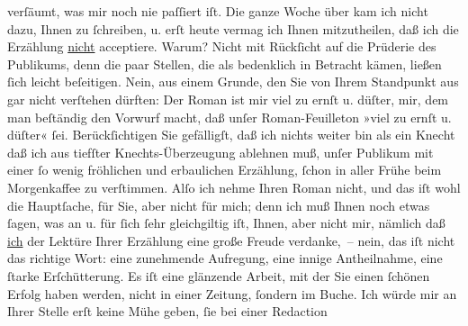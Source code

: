\begin{ledgroupsized}[t]{13cm}
               verſäumt, was mir noch nie paſſiert iſt. Die ganze Woche über kam ich nicht dazu,
               Ihnen zu ſchreiben, u. erſt heute vermag ich Ihnen mitzutheilen, daß ich die
               Erzählung \uline{nicht} acceptiere.\pend
           \pstart
           Warum? Nicht mit Rückſicht auf die Prüderie des Publikums, denn die paar Stellen, die
               als bedenklich in Betracht kämen, ließen ſich leicht beſeitigen. Nein, aus einem
               Grunde, den Sie von Ihrem Standpunkt aus gar nicht verſtehen dürften: Der Roman ist mir viel zu ernſt u.
               düſter, mir, dem man beſtändig den Vorwurf macht, daß unſer Roman-Feuilleton »viel zu
               ernſt u. düſter« ſei. Berückſichtigen Sie gefälligſt, daß ich nichts weiter bin als
               ein Knecht \label{T_L00186-1v}\label{T_L00186-1h} daß ich aus
               tiefſter Knechts-Überzeugung ablehnen muß, unſer Publikum mit einer ſo wenig
               fröhlichen und erbaulichen Erzählung, ſchon in aller Frühe beim Morgenkaffee zu
               verſtimmen.\pend
           \pstart
           Alſo ich nehme Ihren Roman
               nicht, und das iſt wohl die Hauptſache, für Sie, aber nicht für mich; denn ich muß
               Ihnen noch etwas ſagen, was an u. für ſich ſehr gleichgiltig iſt, Ihnen, aber nicht
               mir, nämlich daß {\pb}\uline{ich} der Lektüre Ihrer Erzählung eine große Freude verdanke, – nein, das iſt
                   nicht das richtige Wort: eine zunehmende Aufregung, eine innige
               Antheilnahme, eine ſtarke Erſchütterung. Es iſt eine glänzende Arbeit, mit der Sie
               einen ſchönen Erfolg haben werden, nicht in einer Zeitung, ſondern im Buche. Ich
               würde mir an Ihrer Stelle erſt keine Mühe geben, ſie bei einer Redaction

\end{ledgroupsized}
